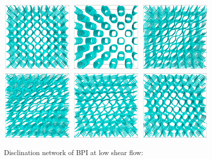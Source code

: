 \documentclass[aps,pre,reprint,superscriptaddress]{revtex4}
\begin{document}
\begin{figure}[h]
\includegraphics[width=0.32\textwidth]{disc-xy-400k_run1115.png}
\includegraphics[width=0.32\textwidth]{disc-yz-400k_run1115.png}
\includegraphics[width=0.32\textwidth]{disc-xy-600k_run1115.png}\\
\includegraphics[width=0.32\textwidth]{disc-xy-725k_run1115.png}
\includegraphics[width=0.32\textwidth]{disc-xy-750k_run1115.png}
\includegraphics[width=0.32\textwidth]{disc-xy-775k_run1115.png}
\caption{Disclination network of BPI at low shear flow:}
\label{bp1-low}
\end{figure}
\end{document}
